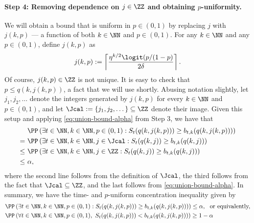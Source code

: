     \paragraph{Step 4: Removing dependence on $j \in \ZZ$ and obtaining $p$-uniformity.}
    We will obtain a bound that is uniform in $p \in (0, 1)$ by replacing $j$ with $j(k,p)$ --- a function of both $k \in \NN$ and $p \in (0, 1)$.
    For any $k \in \NN$ and any $p \in (0, 1)$, define $j(k, p)$ as
    \begin{equation}\label{eq:j_kp}
      j(k,p) := \left \lceil \frac{\eta^{k/2} \logit(p/(1-p)}{2\delta} \right \rceil.
    \end{equation}
    Of course, $j(k,p) \in \ZZ$ is not unique. It is easy to check that $p \leq q(k,j(k,p))$, a fact that we will use shortly. Abusing notation slightly, let $j_1, j_2, \dots$ denote the integers generated by $j(k,p)$ for every $k \in \NN$ and $p \in (0, 1)$, and let $\Jcal := \{j_1, j_2, \dots\} \subseteq \ZZ$ denote their image. Given this setup and applying \eqref{eq:union-bound-alpha} from Step 3, we have that
    \begin{align*}
      &\PP \left ( \exists t \in \NN, k \in \NN, p \in (0, 1) : S_t(q(k,j(k,p))) \geq b_{t, k}(q(k,j(k,p))) \right )\\
      =\ & \PP \left ( \exists t \in \NN, k\in \NN, j \in \Jcal : S_t(q(k,j)) \geq b_{t,k}(q(k,j))  \right ) \\
      \leq\ & \PP \left ( \exists t \in \NN, k\in \NN, j \in \ZZ : S_t(q(k,j)) \geq b_{t,k}(q(k,j))  \right )\\
      \leq\ & \alpha,
    \end{align*}
    where the second line follows from the definition of $\Jcal$, the third follows from the fact that $\Jcal \subseteq \ZZ$, and the last follows from \eqref{eq:union-bound-alpha}.
    In summary, we have the time- and $p$-uniform concentration inequality given by
    \begin{align}
      &\PP \left ( \exists t \in \NN, k \in \NN, p \in (0, 1) : S_t(q(k,j(k,p))) \geq b_{t, k}(q(k,j(k,p))) \right ) \leq \alpha,~~\text{or equivalently,}\\
      &\PP \left ( \forall t \in \NN, k \in \NN, p \in (0, 1),\  S_t(q(k,j(k,p))) < b_{t, k}(q(k,j(k,p))) \right ) \geq 1-\alpha \label{eq:t-and-p-uniform-Stpkjkp}
    \end{align}

